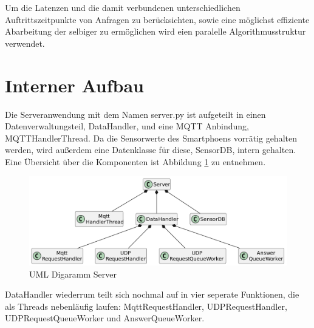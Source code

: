 \documentclass[11pt,a4paper]{report}
\begin{document}
Um die Latenzen und die damit verbundenen unterschiedlichen Auftrittszeitpunkte von Anfragen zu berücksichten, sowie eine möglichst effiziente Abarbeitung der selbiger zu ermöglichen wird eien paralelle Algorithmusstruktur verwendet.

\section{Interner Aufbau}
Die Serveranwendung mit dem Namen server.py ist aufgeteilt in einen Datenverwaltungsteil, DataHandler, und eine MQTT Anbindung, MQTTHandlerThread.
Da die Sensorwerte des Smartphoens vorrätig gehalten werden, wird außerdem eine Datenklasse für diese, SensorDB, intern gehalten.
Eine Übersicht über die Komponenten ist Abbildung \ref{fig:serverUml} zu entnehmen.
\begin{figure}[htbp]
  \centering
  \includegraphics[width=\textwidth]{images/ServerUml}
  \caption{UML Digaramm Server}
  \label{fig:serverUml}
\end{figure}
DataHandler wiederrum teilt sich nochmal auf in vier seperate Funktionen, die als Threads nebenläufig laufen: MqttRequestHandler, UDPRequestHandler, UDPRequestQueueWorker und AnswerQueueWorker.
\end{document}
